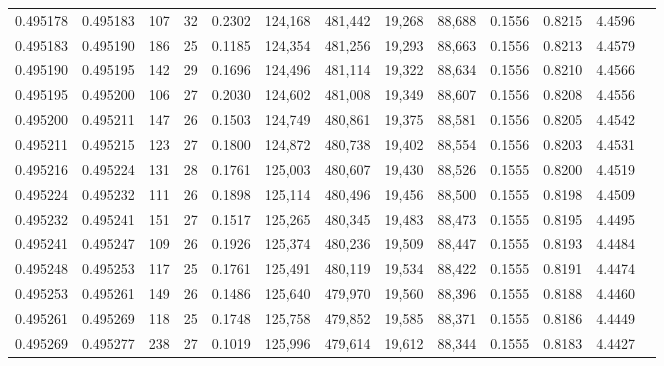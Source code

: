 \begin{tabular}{rrrrrrrrrrrrr}
0.495178 & 0.495183 & 107 &  32 &                                     0.2302 & 124,168 & 481,442 &  19,268 &  88,688 & 0.1556 & 0.8215 & 4.4596 \\
0.495183 & 0.495190 & 186 &  25 &                                     0.1185 & 124,354 & 481,256 &  19,293 &  88,663 & 0.1556 & 0.8213 & 4.4579 \\
0.495190 & 0.495195 & 142 &  29 &                                     0.1696 & 124,496 & 481,114 &  19,322 &  88,634 & 0.1556 & 0.8210 & 4.4566 \\
0.495195 & 0.495200 & 106 &  27 &                                     0.2030 & 124,602 & 481,008 &  19,349 &  88,607 & 0.1556 & 0.8208 & 4.4556 \\
0.495200 & 0.495211 & 147 &  26 &                                     0.1503 & 124,749 & 480,861 &  19,375 &  88,581 & 0.1556 & 0.8205 & 4.4542 \\
0.495211 & 0.495215 & 123 &  27 &                                     0.1800 & 124,872 & 480,738 &  19,402 &  88,554 & 0.1556 & 0.8203 & 4.4531 \\
0.495216 & 0.495224 & 131 &  28 &                                     0.1761 & 125,003 & 480,607 &  19,430 &  88,526 & 0.1555 & 0.8200 & 4.4519 \\
0.495224 & 0.495232 & 111 &  26 &                                     0.1898 & 125,114 & 480,496 &  19,456 &  88,500 & 0.1555 & 0.8198 & 4.4509 \\
0.495232 & 0.495241 & 151 &  27 &                                     0.1517 & 125,265 & 480,345 &  19,483 &  88,473 & 0.1555 & 0.8195 & 4.4495 \\
0.495241 & 0.495247 & 109 &  26 &                                     0.1926 & 125,374 & 480,236 &  19,509 &  88,447 & 0.1555 & 0.8193 & 4.4484 \\
0.495248 & 0.495253 & 117 &  25 &                                     0.1761 & 125,491 & 480,119 &  19,534 &  88,422 & 0.1555 & 0.8191 & 4.4474 \\
0.495253 & 0.495261 & 149 &  26 &                                     0.1486 & 125,640 & 479,970 &  19,560 &  88,396 & 0.1555 & 0.8188 & 4.4460 \\
0.495261 & 0.495269 & 118 &  25 &                                     0.1748 & 125,758 & 479,852 &  19,585 &  88,371 & 0.1555 & 0.8186 & 4.4449 \\
0.495269 & 0.495277 & 238 &  27 &                                     0.1019 & 125,996 & 479,614 &  19,612 &  88,344 & 0.1555 & 0.8183 & 4.4427 \\

\end{tabular}
